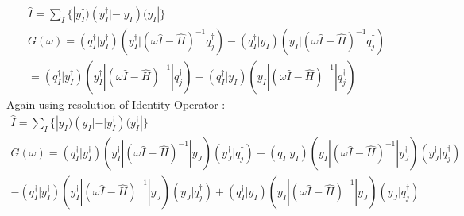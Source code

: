 \documentclass[11pt, oneside]{article}   	%
\begin{document}
\begin{equation*}\label{eq:resolution of identity}
  \begin{aligned}
    \hat I=\sum_I \{ |y_I^\dagger)(y_I^\dagger|-|y_I)(y_I|\}\\
    G(\omega)=(q_I^\dagger|y_I^\dagger)(y_I^\dagger|(\omega \hat I - \hat H)^{-1}q_j^\dagger) - (q_I^\dagger|y_I)(y_I|(\omega \hat I - \hat H)^{-1}q_j^\dagger)\\
    =(q_I^\dagger|y_I^\dagger)(y_I^\dagger|(\omega \hat I - \hat H)^{-1}|q_j^\dagger) - (q_I^\dagger|y_I)(y_I|(\omega \hat I - \hat H)^{-1}|q_j^\dagger)
  \end{aligned}
\end{equation*}
Again using resolution of Identity Operator : 
\begin{equation*}\label{eq:resolution of identity}
  \begin{aligned}
    \hat I=\sum_I \{ |y_I)(y_I|-|y_I^\dagger)(y_I^\dagger|\}\\
    G(\omega)=(q_I^\dagger|y_I^\dagger)(y_I^\dagger|(\omega \hat I - \hat H)^{-1}|y_J^\dagger)(y_J^\dagger|q_j^\dagger) - (q_I^\dagger|y_I)(y_I|(\omega \hat I - \hat H)^{-1}|y_J^\dagger)(y_J^\dagger|q_j^\dagger)\\
 - (q_I^\dagger|y_I^\dagger)(y_I^\dagger|(\omega \hat I - \hat H)^{-1}|y_J)(y_J|q_j^\dagger) + (q_I^\dagger|y_I)(y_I|(\omega \hat I - \hat H)^{-1}|y_J)(y_J|q_j^\dagger)
  \end{aligned}
\end{equation*}

\subsection{}
\end{document}
